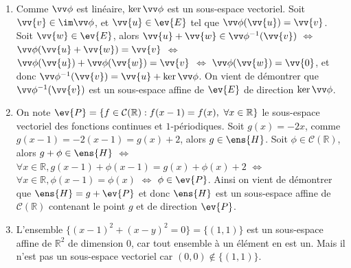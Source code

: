 \documentclass[a4paper,12pt,reqno]{amsart}
\begin{document}
\begin{solution}

  \begin{enumerate}
    \item Comme $\vv\phi$ est linéaire, $\ker{\vv\phi}$ est un sous-espace vectoriel. Soit $\vv{v}\in\im\vv\phi$, et $\vv{u}\in\ev{E}$ tel que $\vv\phi(\vv{u})=\vv{v}$. Soit $\vv{w} \in \ev{E}$, alors $\vv{u}+\vv{w} \in \vv\phi^{-1}(\vv{v})$ $\Leftrightarrow$ $\vv\phi(\vv{u}+\vv{w})=\vv{v}$ $\Leftrightarrow$ $\vv\phi(\vv{u})+\vv\phi(\vv{w})=\vv{v}$ $\Leftrightarrow$ $\vv\phi(\vv{w})=\vv{0}$, et donc $\vv\phi^{-1}(\vv{v}) = \vv{u} + \ker{\vv\phi}$. On vient de démontrer que $\vv\phi^{-1}(\vv{v})$ est un sous-espace affine de $\ev{E}$ de direction $\ker{\vv\phi}$.
    \item On note $\ev{P} = \{ f \in \mathcal{C}(\mathbb{R}) : f(x-1)=f(x), \ \forall x \in \mathbb{R} \}$ le sous-espace vectoriel des fonctions continues et $1$-périodiques. Soit $g(x)=-2x$, comme $g(x-1)=-2(x-1)=g(x)+2$, alors $g\in\ens{H}$. Soit $\phi \in \mathcal{C}(\mathbb{R})$, alors $g+\phi \in \ens{H}$ $\Leftrightarrow$ $\forall x \in \mathbb{R}, g(x-1)+\phi(x-1)=g(x)+\phi(x)+2$ $\Leftrightarrow$ $\forall x \in \mathbb{R}, \phi(x-1)=\phi(x)$ $\Leftrightarrow$ $\phi \in \ev{P}$. Ainsi on vient de démontrer que $\ens{H}=g+\ev{P}$ et donc $\ens{H}$ est un sous-espace affine de $\mathcal{C}(\mathbb{R})$ contenant le point $g$ et de direction $\ev{P}$.
    \item L'ensemble $\{(x-1)^{2}+(x-y)^{2}=0\}=\{(1,1)\}$ est un sous-espace affine de $\mathbb{R}^{2}$ de dimension $0$, car tout ensemble à un élément en est un. Mais il n'est pas un sous-espace vectoriel car $(0,0) \notin \{(1,1)\}$.
  \end{enumerate}
\end{solution}
\end{document}
